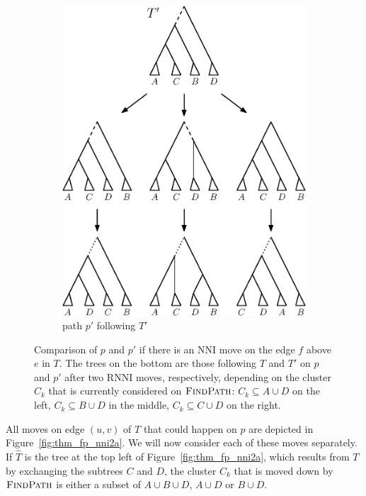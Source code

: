 \documentclass{amsart}
\newcommand{\rnni}{\mathrm{RNNI}}
\newcommand{\findpath}{\textsc{FindPath}}
\newcommand{\nni}{\mathrm{NNI}}
\begin{document}
\begin{enumerate}
\begin{figure}[H]
\begin{subfigure}[b]{.45\textwidth}
            \includegraphics[width=0.9\linewidth]{thm_fp_nni2b.eps}
            \vspace{12pt}
            \caption{path $p'$ following $T'$}
            \label{fig:thm_fp_nni2b}
        \end{subfigure}
        \caption{Comparison of $p$ and $p'$ if there is an $\nni$ move on the edge $f$ above $e$ in $T$.
        The trees on the bottom are those following $T$ and $T'$ on $p$ and $p'$ after two $\rnni$ moves, respectively, depending on the cluster $C_k$ that is currently considered on $\findpath$:
        ${C_k \subseteq A \cup D}$ on the left, ${C_k \subseteq B \cup D}$ in the middle, ${C_k \subseteq C \cup D}$ on the right.}
    \end{figure}

    All moves on edge $(u,v)$ of $T$ that could happen on $p$ are depicted in Figure~\ref{fig:thm_fp_nni2a}.
    We will now consider each of these moves separately.
    If $\hat T$ is the tree at the top left of Figure~\ref{fig:thm_fp_nni2a}, which results from $T$ by exchanging the subtrees $C$ and $D$, the cluster $C_k$ that is moved down by $\findpath$ is either a subset of $A \cup B \cup D$, $A \cup D$ or $B \cup D$.


\end{enumerate}
\end{document}
